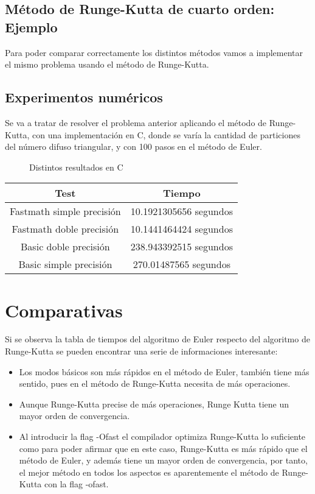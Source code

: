 \subsection{Método de Runge-Kutta de cuarto orden: Ejemplo}
Para poder comparar correctamente los distintos métodos vamos a implementar el mismo problema usando el método de Runge-Kutta.

\subsection{Experimentos numéricos}
Se va a tratar de resolver el problema anterior aplicando el método de Runge-Kutta, con una implementación en C, donde se varía la cantidad de particiones del número difuso triangular, y con 100 pasos en el método de Euler.

\begin{figure}[H]
	\centering
	\caption{Distintos resultados en C}
	\label{fig:rungekuttacseq}
\end{figure}

\begin{table}[H]
	\centering
	\begin{tabular}{|c|c|}
		\hline
		\textbf{Test}  & \textbf{Tiempo}        \\ \hline
		Fastmath simple precisión   & 10.1921305656 segundos    \\
		Fastmath doble precisión  & 10.1441464424 segundos   \\
		Basic doble precisión  &238.943392515 segundos    \\
	    Basic simple precisión & 270.01487565 segundos \\ 
		\hline
	\end{tabular}%
\end{table}

\section{Comparativas}
Si se observa la tabla de tiempos del algoritmo de Euler respecto del algoritmo de Runge-Kutta se pueden encontrar una serie de informaciones interesante:

\begin{itemize}
	\item Los modos básicos son más rápidos en el método de Euler, también tiene más sentido, pues en el método de Runge-Kutta necesita de más operaciones.
	
	\item Aunque Runge-Kutta precise de más operaciones, Runge Kutta tiene un mayor orden de convergencia.
	
	\item Al introducir la flag -Ofast el compilador optimiza Runge-Kutta lo suficiente como para poder afirmar que en este caso, Runge-Kutta es más rápido que el método de Euler, y además tiene un mayor orden de convergencia, por tanto, el mejor método en todos los aspectos es aparentemente el método de Runge-Kutta con la flag -ofast.
\end{itemize}

